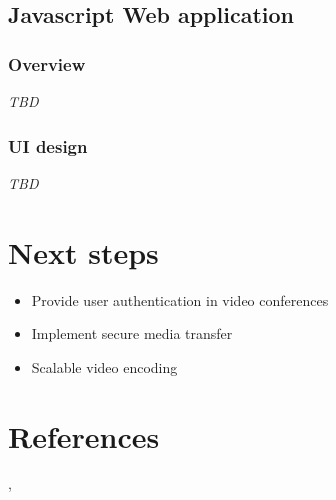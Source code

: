 \documentclass[12pt]{article}
\begin{document}
\subsection{Javascript Web application}
\subsubsection{Overview}
\textit{TBD}
\subsubsection{UI design}
\textit{TBD}

\section{Next steps}
\begin{itemize}
\item Provide user authentication in video conferences
\item Implement secure media transfer
\item Scalable video encoding
\end{itemize}

\section{References} \cite{videoTR}, \cite{ChronosTR}


\end{document}
